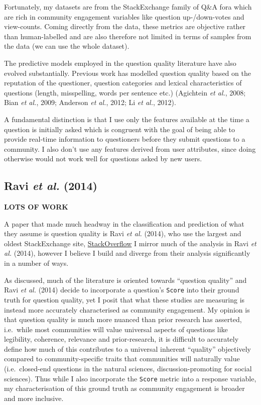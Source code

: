 \documentclass[11pt,preprint, authoryear]{article}
\numberwithin{equation}{section}
\begin{document}
Fortunately, my datasets are from the StackExchange family of Q\&A fora
which are rich in community engagement variables like question
up-/down-votes and view-counts. Coming directly from the data, these
metrics are objective rather than human-labelled and are also therefore
not limited in terms of samples from the data (we can use the whole
dataset).

The predictive models employed in the question quality literature have
also evolved substantially. Previous work has modelled question quality
based on the reputation of the questioner, question categories and
lexical characteristics of questions (length, misspelling, words per
sentence etc.) (Agichtein \emph{et al.}, 2008; Bian \emph{et al.}, 2009;
Anderson \emph{et al.}, 2012; Li \emph{et al.}, 2012).

A fundamental distinction is that I use only the features available at
the time a question is initially asked which is congruent with the goal
of being able to provide real-time information to questioners before
they submit questions to a community. I also don't use any features
derived from user attributes, since doing otherwise would not work well
for questions asked by new users.

\newpage

\subsection{\texorpdfstring{Ravi \emph{et al.}
(2014)}{Ravi et al. (2014)}}\label{ravi2014}

\textbf{LOTS OF WORK}

A paper that made much headway in the classification and prediction of
what they assume is question quality is Ravi \emph{et al.} (2014), who
use the largest and oldest StackExchange site,
\href{https://stackoverflow.com}{StackOverflow} I mirror much of the
analysis in Ravi \emph{et al.} (2014), however I believe I build and
diverge from their analysis significantly in a number of ways.

As discussed, much of the literature is oriented towards ``question
quality'' and Ravi \emph{et al.} (2014) decide to incorporate a
question's \texttt{Score} into their ground truth for question quality,
yet I posit that what these studies are measuring is instead more
accurately characterised as community engagement. My opinion is that
question quality is much more nuanced than prior research has asserted,
i.e.~while most communities will value universal aspects of questions
like legibility, coherence, relevance and prior-research, it is
difficult to accurately define how much of this contributes to a
universal inherent ``quality'' objectively compared to
community-specific traits that communities will naturally value
(i.e.~closed-end questions in the natural sciences, discussion-promoting
for social sciences). Thus while I also incorporate the \texttt{Score}
metric into a response variable, my characterisation of this ground
truth as community engagement is broader and more inclusive.
\end{document}
